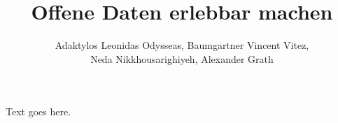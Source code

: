 \documentclass{beamer}
\title{Offene Daten erlebbar machen}
\date{}
\author{Adaktylos Leonidas Odysseas, Baumgartner Vincent Vitez,\\ Neda Nikkhousarighiyeh, Alexander Grath}
\begin{document}
  \maketitle
  Text goes here.
\end{document}
